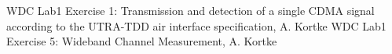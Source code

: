 


	

	
	
	
	
	
	

	
	
	
	\begin{thebibliography}{99}
	 WDC Lab1 Exercise 1: Transmission and detection of a single CDMA signal according to the UTRA-TDD air interface specification, A. Kortke
	 WDC Lab1 Exercise 5: Wideband Channel Measurement, A. Kortke
		
	\end{thebibliography}
	
	
